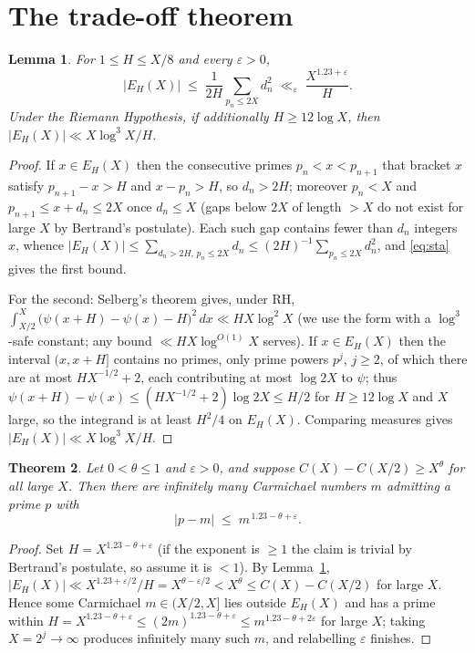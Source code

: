 \documentclass[11pt]{amsart}
\newtheorem{theorem}{Theorem}[section]
\newtheorem{lemma}[theorem]{Lemma}
\newcommand{\CC}{C}
\begin{document}
\section{The trade-off theorem}
\label{sec:tradeoff}

\begin{lemma}
\label{lem:E}
For $1 \le H \le X/8$ and every $\varepsilon > 0$,
\[
|E_H(X)| \;\le\; \frac{1}{2H} \sum_{p_n \le 2X} d_n^2
\;\ll_\varepsilon\; \frac{X^{1.23+\varepsilon}}{H}.
\]
Under the Riemann Hypothesis, if additionally $H \ge 12 \log X$, then
$|E_H(X)| \ll X \log^3 X / H$.
\end{lemma}

\begin{proof}
If $x \in E_H(X)$ then the consecutive primes $p_n < x < p_{n+1}$ that bracket
$x$ satisfy $p_{n+1} - x > H$ and $x - p_n > H$, so $d_n > 2H$; moreover
$p_n < X$ and $p_{n+1} \le x + d_n \le 2X$ once $d_n \le X$ (gaps below $2X$
of length $> X$ do not exist for large $X$ by Bertrand's postulate). Each such
gap contains fewer than $d_n$ integers $x$, whence
$|E_H(X)| \le \sum_{d_n > 2H,\, p_n \le 2X} d_n \le (2H)^{-1} \sum_{p_n \le 2X}
d_n^2$, and \eqref{eq:sta} gives the first bound.

For the second: Selberg's theorem \cite{Sel} gives, under RH,
$\int_{X/2}^{X} \bigl(\psi(x+H) - \psi(x) - H\bigr)^2\, dx \ll H X \log^2 X$
(we use the form with a $\log^3$-safe constant; any bound
$\ll HX\log^{O(1)}X$ serves). If $x \in E_H(X)$ then the interval
$(x, x+H]$ contains no primes, only prime powers $p^j$, $j \ge 2$, of which
there are at most $H X^{-1/2} + 2$, each contributing at most $\log 2X$ to
$\psi$; thus $\psi(x+H) - \psi(x) \le (H X^{-1/2} + 2)\log 2X \le H/2$ for
$H \ge 12 \log X$ and $X$ large, so the integrand is at least $H^2/4$ on
$E_H(X)$. Comparing measures gives $|E_H(X)| \ll X \log^3 X / H$.
\end{proof}

\begin{theorem}
\label{thm:tradeoff}
Let $0 < \theta \le 1$ and $\varepsilon > 0$, and suppose
$\CC(X) - \CC(X/2) \ge X^{\theta}$ for all large $X$. Then there are
infinitely many Carmichael numbers $m$ admitting a prime $p$ with
\[
|p - m| \;\le\; m^{\,1.23 - \theta + \varepsilon}.
\]
\end{theorem}

\begin{proof}
Set $H = X^{1.23 - \theta + \varepsilon}$ (if the exponent is $\ge 1$ the claim
is trivial by Bertrand's postulate, so assume it is $< 1$). By
Lemma~\ref{lem:E}, $|E_H(X)| \ll X^{1.23 + \varepsilon/2}/H =
X^{\theta - \varepsilon/2} < X^{\theta} \le \CC(X) - \CC(X/2)$ for large $X$.
Hence some Carmichael $m \in (X/2, X]$ lies outside $E_H(X)$ and has a prime
within $H = X^{1.23-\theta+\varepsilon} \le (2m)^{1.23-\theta+\varepsilon} \le
m^{1.23-\theta+2\varepsilon}$ for large $X$; taking $X = 2^j \to \infty$
produces infinitely many such $m$, and relabelling $\varepsilon$ finishes.
\end{proof}
\end{document}

